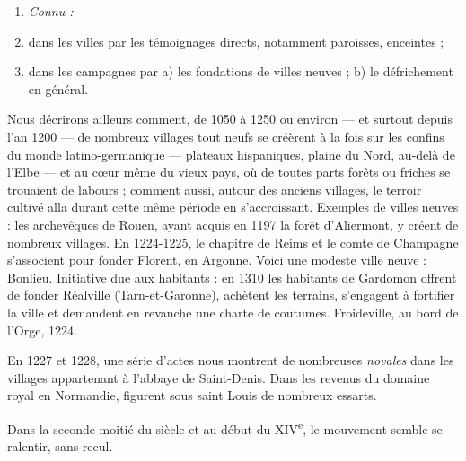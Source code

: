 \documentclass[french,twoside]{book} %
\newlength{\listmod}
\newcommand{\listhead}[1]{\hspace{-1\listmod}\emph{#1}}
\begin{document}
\begin{enumerate}[itemsep=0pt,]
\item[]\listhead{Connu :}
\item dans les villes par les témoignages directs, notamment paroisses, enceintes ;
\item dans les campagnes par a) les fondations de villes neuves ; b) le défrichement en général.

\end{enumerate}\noindent Nous décrirons ailleurs comment, de 1050 à 1250 ou environ — et surtout depuis l’an 1200 — de nombreux villages tout neufs se créèrent à la fois sur les confins du monde latino-germanique — plateaux hispaniques, plaine du Nord, au-delà de l’Elbe — et au cœur même du vieux pays, où de toutes parts forêts ou friches se trouaient de labours ; comment aussi, autour des anciens villages, le terroir cultivé alla durant cette même période en s’accroissant. Exemples de villes neuves : les archevêques de Rouen, ayant acquis en 1197 la forêt d’Aliermont, y créent de nombreux villages. En 1224-1225, le chapitre de Reims et le comte de Champagne s’associent pour fonder Florent, en Argonne. Voici une modeste ville neuve : Bonlieu. Initiative due aux habitants : en 1310 les habitants de Gardomon offrent de fonder Réalville (Tarn-et-Garonne), achètent les terrains, s’engagent à fortifier la ville et demandent en revanche une charte de coutumes. Froideville, au bord de l’Orge, 1224.\par
En 1227 et 1228, une série d’actes nous montrent de nombreuses {\itshape novales} dans les villages appartenant à l’abbaye de Saint-Denis. Dans les revenus du domaine royal en Normandie, figurent sous saint Louis de nombreux essarts.\par
Dans la seconde moitié du siècle et au début du XIV\textsuperscript{e}, le mouvement semble se ralentir, sans recul.\par
\end{document}
